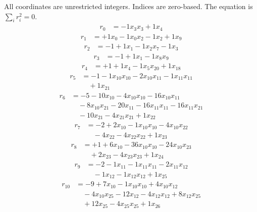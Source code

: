 \begingroup\small
All coordinates are unrestricted integers. Indices are zero-based. The equation is $\sum_i r_i^2=0$.
\[\begin{aligned}
r_{0} &= - 1 x_{3} x_{3} + 1 x_{4}
\end{aligned}\]
\[\begin{aligned}
r_{1} &= + 1 x_{0} - 1 x_{0} x_{2} - 1 x_{2} + 1 x_{9}
\end{aligned}\]
\[\begin{aligned}
r_{2} &= - 1 + 1 x_{1} - 1 x_{2} x_{7} - 1 x_{3}
\end{aligned}\]
\[\begin{aligned}
r_{3} &= - 1 + 1 x_{1} - 1 x_{8} x_{9}
\end{aligned}\]
\[\begin{aligned}
r_{4} &= + 1 + 1 x_{4} - 1 x_{5} x_{20} + 1 x_{18}
\end{aligned}\]
\[\begin{aligned}
r_{5} &= - 1 - 1 x_{10} x_{10} - 2 x_{10} x_{11} - 1 x_{11} x_{11} \\
 &\quad + 1 x_{21}
\end{aligned}\]
\[\begin{aligned}
r_{6} &= - 5 - 10 x_{10} - 4 x_{10} x_{10} - 16 x_{10} x_{11} \\
 &\quad - 8 x_{10} x_{21} - 20 x_{11} - 16 x_{11} x_{11} - 16 x_{11} x_{21} \\
 &\quad - 10 x_{21} - 4 x_{21} x_{21} + 1 x_{22}
\end{aligned}\]
\[\begin{aligned}
r_{7} &= - 2 + 2 x_{10} - 1 x_{10} x_{10} - 4 x_{10} x_{22} \\
 &\quad - 4 x_{22} - 4 x_{22} x_{22} + 1 x_{23}
\end{aligned}\]
\[\begin{aligned}
r_{8} &= + 1 + 6 x_{10} - 36 x_{10} x_{10} - 24 x_{10} x_{23} \\
 &\quad + 2 x_{23} - 4 x_{23} x_{23} + 1 x_{24}
\end{aligned}\]
\[\begin{aligned}
r_{9} &= - 2 - 1 x_{11} - 1 x_{11} x_{11} - 2 x_{11} x_{12} \\
 &\quad - 1 x_{12} - 1 x_{12} x_{12} + 1 x_{25}
\end{aligned}\]
\[\begin{aligned}
r_{10} &= - 9 + 7 x_{10} - 1 x_{10} x_{10} + 4 x_{10} x_{12} \\
 &\quad - 4 x_{10} x_{25} - 12 x_{12} - 4 x_{12} x_{12} + 8 x_{12} x_{25} \\
 &\quad + 12 x_{25} - 4 x_{25} x_{25} + 1 x_{26}
\end{aligned}\]
